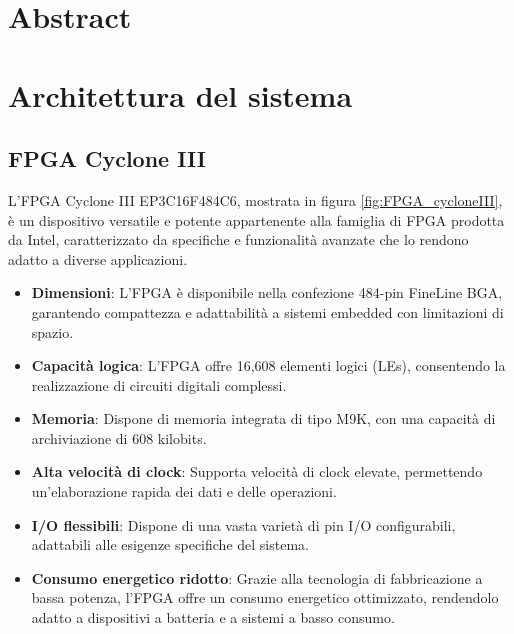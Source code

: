 \documentclass[titlepage]{report}
\begin{document}
  
\setlength{\parskip}{\baselineskip} 

\begin{frontespizio}
\end{frontespizio}
\tableofcontents
\newpage


\chapter*{Abstract}
\label{ch:intro}


\chapter*{Architettura del sistema}
\label{ch:architettura}

	\section*{FPGA Cyclone III}
	\label{sec:fpga}
		L'FPGA Cyclone III EP3C16F484C6, mostrata in figura \ref{fig:FPGA_cycloneIII}, è un dispositivo versatile e potente appartenente alla famiglia di FPGA prodotta da Intel, caratterizzato da specifiche e funzionalità avanzate che lo rendono adatto a diverse applicazioni.

		\begin{itemize}
			\item \textbf{Dimensioni}: L'FPGA è disponibile nella confezione 484-pin FineLine BGA, garantendo compattezza e adattabilità a sistemi embedded con limitazioni di spazio.
			\item \textbf{Capacità logica}: L'FPGA offre 16,608 elementi logici (LEs), consentendo la realizzazione di circuiti digitali complessi.
			\item \textbf{Memoria}: Dispone di memoria integrata di tipo M9K, con una capacità di archiviazione di 608 kilobits.
			\item \textbf{Alta velocità di clock}: Supporta velocità di clock elevate, permettendo un'elaborazione rapida dei dati e delle operazioni.
			\item \textbf{I/O flessibili}: Dispone di una vasta varietà di pin I/O configurabili, adattabili alle esigenze specifiche del sistema.
			\item \textbf{Consumo energetico ridotto}: Grazie alla tecnologia di fabbricazione a bassa potenza, l'FPGA offre un consumo energetico ottimizzato, rendendolo adatto a dispositivi a batteria e a sistemi a basso consumo.
		\end{itemize}
		
\end{document}
